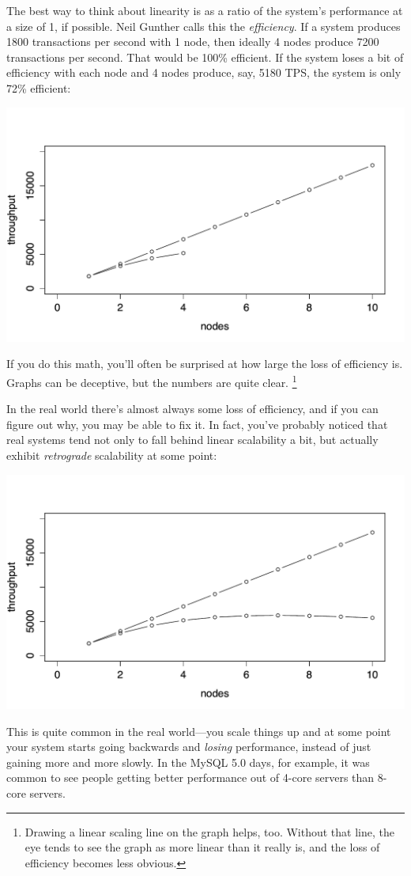 \documentclass{vivid_layout}
\begin{document}
The best way to think about linearity is as a ratio of the system's performance
at a size of 1, if possible. Neil Gunther calls this the {\itshape efficiency}.
If a system produces 1800 transactions per second with 1 node, then ideally 4
nodes produce 7200 transactions per second. That would be 100\% efficient. If
the system loses a bit of efficiency with each node and 4 nodes produce, say,
5180 TPS, the system is only 72\% efficient:
\begin{center}
\includegraphics[width=.85\linewidth]{scalability/linear2}
\end{center}
If you do this math, you'll often be surprised at how large the loss of
efficiency is.  Graphs can be deceptive, but the numbers are quite clear.
\footnote{Drawing a linear scaling line on the graph helps, too. Without that
line, the eye tends to see the graph as more linear than it really is, and the
loss of efficiency becomes less obvious.}


In the real world there's almost always some loss of efficiency, and if you can
figure out why, you may be able to fix it. In fact, you've probably noticed that
real systems tend not only to fall behind linear scalability a bit, but actually
exhibit {\itshape retrograde} scalability at some point:
\begin{center}
\includegraphics[width=.85\linewidth]{scalability/linear3}
\end{center}
This is quite common in the real world---you scale things up and at some point
your system starts going backwards and {\itshape losing} performance, instead of
just gaining more and more slowly. In the MySQL 5.0 days, for example, it was
common to see people getting better performance out of 4-core servers than
8-core servers.
\end{document}
